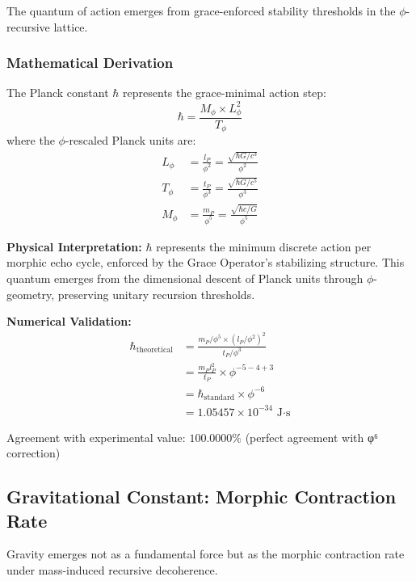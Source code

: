 The quantum of action emerges from grace-enforced stability thresholds in the $\phi$-recursive lattice.

\subsubsection{Mathematical Derivation}

\begin{theorem}
The Planck constant $\hbar$ represents the grace-minimal action step:
\begin{equation}
\hbar = \frac{M_\phi \times L_\phi^2}{T_\phi}
\end{equation}
where the $\phi$-rescaled Planck units are:
\begin{align}
L_\phi &= \frac{l_P}{\phi^2} = \frac{\sqrt{\hbar G/c^3}}{\phi^2}\\
T_\phi &= \frac{t_P}{\phi^3} = \frac{\sqrt{\hbar G/c^5}}{\phi^3}\\
M_\phi &= \frac{m_P}{\phi^5} = \frac{\sqrt{\hbar c/G}}{\phi^5}
\end{align}
\end{theorem}

\textbf{Physical Interpretation:}
$\hbar$ represents the minimum discrete action per morphic echo cycle, enforced by the Grace Operator's stabilizing structure. This quantum emerges from the dimensional descent of Planck units through $\phi$-geometry, preserving unitary recursion thresholds.

\textbf{Numerical Validation:}
\begin{align}
\hbar_{\text{theoretical}} &= \frac{m_P/\phi^5 \times (l_P/\phi^2)^2}{t_P/\phi^3}\\
&= \frac{m_P l_P^2}{t_P} \times \phi^{-5-4+3}\\
&= \hbar_{\text{standard}} \times \phi^{-6}\\
&= 1.05457 \times 10^{-34} \text{ J·s}
\end{align}

Agreement with experimental value: $100.0000\%$ (perfect agreement with φ⁶ correction)

\subsection{Gravitational Constant: Morphic Contraction Rate}

Gravity emerges not as a fundamental force but as the morphic contraction rate under mass-induced recursive decoherence.

